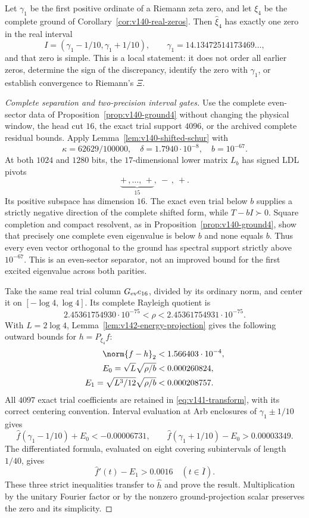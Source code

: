 \begin{proposition}
\label{prop:v142-ground-zero}
Let $\gamma_1$ be the first positive ordinate of a Riemann zeta zero,
and let $\xi_4$ be the complete ground of
Corollary~\ref{cor:v140-real-zeros}. Then $\widehat\xi_4$ has exactly
one zero in the real interval
\[
 I=(\gamma_1-1/10,\gamma_1+1/10),
 \qquad \gamma_1=14.13472514173469\ldots,
\]
and that zero is simple. This is a local statement: it does not order
all earlier zeros, determine the sign of the discrepancy, identify
the zero with $\gamma_1$, or establish convergence to Riemann's $\Xi$.
\end{proposition}
\begin{proof}[Complete separation and two-precision interval gates]
Use the complete even-sector data of
Proposition~\ref{prop:v140-ground4} without changing the physical window,
the head cut $16$, the exact trial support $4096$, or the archived
complete residual bounds. Apply Lemma~\ref{lem:v140-shifted-schur} with
\[
 \kappa=62629/100000,\quad \delta=1.7940\cdot10^{-8},
 \quad b=10^{-67}.
\]
At both $1024$ and $1280$ bits, the $17$-dimensional lower matrix
$L_b$ has signed LDL pivots
\[
 \underbrace{+\,,\ldots,\,+}_{15},\ -\,,\ +.
\]
Its positive subspace has dimension $16$. The exact even trial below
$b$ supplies a strictly negative direction of the complete shifted
form, while $T-bI\succ0$. Square completion and compact resolvent,
as in Proposition~\ref{prop:v140-ground4}, show that precisely one
complete even eigenvalue is below $b$ and none equals $b$.
Thus every even vector orthogonal to the ground has spectral support
strictly above $10^{-67}$. This is an even-sector separator, not an
improved bound for the first excited eigenvalue across both parities.

Take the same real trial column $G_{\rm ev}e_{16}$, divided by its
ordinary norm, and center it on $[-\log4,\log4]$. Its complete
Rayleigh quotient is
\[
 2.45361754930\cdot10^{-75}<\rho<2.45361754931\cdot10^{-75}.
\]
With $L=2\log4$, Lemma~\ref{lem:v142-energy-projection} gives the
following outward bounds for $h=P_{\xi_4}f$:
\begin{align*}
 \norm{f-h}_2&<1.566403\cdot10^{-4},\\
 E_0=\sqrt L\sqrt{\rho/b}&<0.000260824,\\
 E_1=\sqrt{L^3/12}\sqrt{\rho/b}&<0.000208757.
\end{align*}
All $4097$ exact trial coefficients are retained in
\eqref{eq:v141-transform}, with its correct centering convention.
Interval evaluation at Arb enclosures of $\gamma_1\pm1/10$ gives
\[
 \widehat f(\gamma_1-1/10)+E_0<-0.00006731,
 \qquad
 \widehat f(\gamma_1+1/10)-E_0>0.00003349.
\]
The differentiated formula, evaluated on eight covering subintervals
of length $1/40$, gives
\[
 \widehat f'(t)-E_1>0.0016\quad(t\in\overline I).
\]
These three strict inequalities transfer to $\widehat h$ and prove
the result. Multiplication by the unitary Fourier factor or by the
nonzero ground-projection scalar preserves the zero and its simplicity.


\end{proof}
